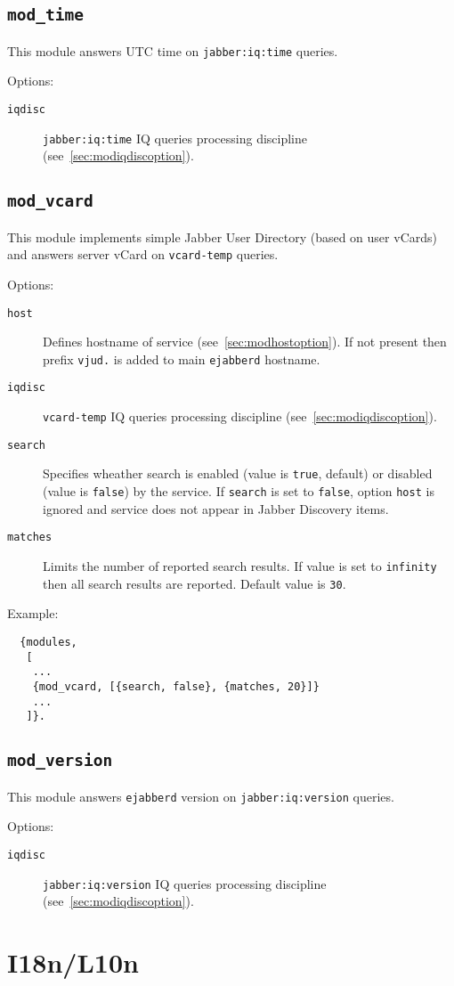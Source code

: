 \documentclass[a4paper,10pt]{article}
\newcommand{\bracehack}{\def\{{\char"7B}\def\}{\char"7D}}
\newcommand{\ns}[1]{\texttt{#1}}
\newcommand{\jid}[1]{\texttt{#1}}
\newcommand{\term}[1]{\texttt{#1}}
\newcommand{\ejabberd}{\texttt{ejabberd}}
\newcommand{\module}[1]{\texttt{#1}}
\newcommand{\modtime}{\module{mod\_time}}
\newcommand{\modvcard}{\module{mod\_vcard}}
\newcommand{\modversion}{\module{mod\_version}}
\newcommand{\titem}[1]{\item[\bracehack\texttt{#1}]}
\newcommand{\iqdiscitem}[1]{\titem{iqdisc} #1 IQ queries processing
discipline (see~\ref{sec:modiqdiscoption}).}
\newcommand{\hostitem}[1]{\titem{host} Defines hostname of service
(see~\ref{sec:modhostoption}). If not present
then prefix \jid{#1.} is added to main \ejabberd{} hostname.}
\begin{document}
\subsection{\modtime{}}
\label{sec:modtime}

This module answers UTC time on \ns{jabber:iq:time} queries.

Options:
\begin{description}
\iqdiscitem{\ns{jabber:iq:time}}
\end{description}


\subsection{\modvcard{}}
\label{sec:modvcard}

This module implements simple Jabber User Directory (based on user vCards)
and answers server vCard on \ns{vcard-temp} queries.

Options:
\begin{description}
\hostitem{vjud}
\iqdiscitem{\ns{vcard-temp}}
\titem{search} Specifies wheather search is enabled (value is \term{true}, default) or
disabled (value is \term{false}) by the service. If \term{search} is set to \term{false},
option \term{host} is ignored and service does not appear in Jabber Discovery items.
\titem{matches} Limits the number of reported search results. If value is set to
\term{infinity} then all search results are reported. Default value is \term{30}.
\end{description}

Example:
\begin{verbatim}
  {modules,
   [
    ...
    {mod_vcard, [{search, false}, {matches, 20}]}
    ...
   ]}.
\end{verbatim}


\subsection{\modversion{}}
\label{sec:modversion}

This module answers \ejabberd{} version on \ns{jabber:iq:version} queries.

Options:
\begin{description}
\iqdiscitem{\ns{jabber:iq:version}}
\end{description}


\section{I18n/L10n}
\label{sec:i18nl10n}
\end{document}
